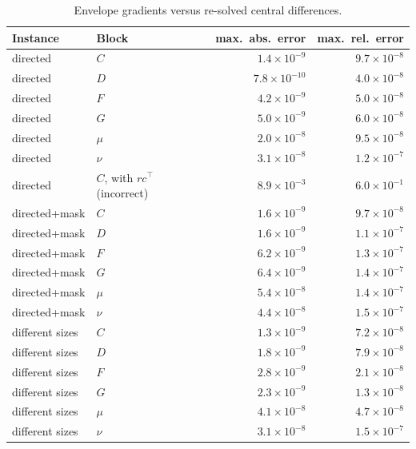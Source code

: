 \documentclass[12pt]{article}
\begin{document}
\begin{table}[h]
\caption{Envelope gradients versus re-solved central differences.}\label{tab:grad}
\centering\small
\begin{tabular}{llrr}
\toprule
Instance & Block & max.\ abs.\ error & max.\ rel.\ error\\
\midrule
directed & $C$ & $1.4\times10^{-9}$ & $9.7\times10^{-8}$\\
directed & $D$ & $7.8\times10^{-10}$ & $4.0\times10^{-8}$\\
directed & $F$ & $4.2\times10^{-9}$ & $5.0\times10^{-8}$\\
directed & $G$ & $5.0\times10^{-9}$ & $6.0\times10^{-8}$\\
directed & $\mu$ & $2.0\times10^{-8}$ & $9.5\times10^{-8}$\\
directed & $\nu$ & $3.1\times10^{-8}$ & $1.2\times10^{-7}$\\
directed & $C$, with $rc^\top$ (incorrect) & $8.9\times10^{-3}$ & $6.0\times10^{-1}$\\
directed+mask & $C$ & $1.6\times10^{-9}$ & $9.7\times10^{-8}$\\
directed+mask & $D$ & $1.6\times10^{-9}$ & $1.1\times10^{-7}$\\
directed+mask & $F$ & $6.2\times10^{-9}$ & $1.3\times10^{-7}$\\
directed+mask & $G$ & $6.4\times10^{-9}$ & $1.4\times10^{-7}$\\
directed+mask & $\mu$ & $5.4\times10^{-8}$ & $1.4\times10^{-7}$\\
directed+mask & $\nu$ & $4.4\times10^{-8}$ & $1.5\times10^{-7}$\\
different sizes & $C$ & $1.3\times10^{-9}$ & $7.2\times10^{-8}$\\
different sizes & $D$ & $1.8\times10^{-9}$ & $7.9\times10^{-8}$\\
different sizes & $F$ & $2.8\times10^{-9}$ & $2.1\times10^{-8}$\\
different sizes & $G$ & $2.3\times10^{-9}$ & $1.3\times10^{-8}$\\
different sizes & $\mu$ & $4.1\times10^{-8}$ & $4.7\times10^{-8}$\\
different sizes & $\nu$ & $3.1\times10^{-8}$ & $1.5\times10^{-7}$\\
\bottomrule
\end{tabular}

\end{table}
\end{document}
